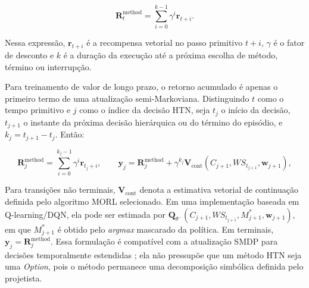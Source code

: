 \begin{equation}
\mathbf{R}^{\mathrm{method}}_t =
\sum_{i=0}^{k-1}\gamma^i\mathbf{r}_{t+i}.
\end{equation}

Nessa expressão, $\mathbf{r}_{t+i}$ é a recompensa vetorial no passo primitivo
$t+i$, $\gamma$ é o fator de desconto e $k$ é a duração da execução até a
próxima escolha de método, término ou interrupção.

Para treinamento de valor de longo prazo, o retorno acumulado é apenas o
primeiro termo de uma atualização semi-Markoviana.
Distinguindo $t$ como o tempo primitivo e $j$ como o índice da decisão HTN,
seja $t_j$ o início da decisão, $t_{j+1}$ o instante da próxima decisão
hierárquica ou do término do episódio, e $k_j=t_{j+1}-t_j$.
Então:

\begin{equation}
\mathbf{R}^{\mathrm{method}}_j =
\sum_{i=0}^{k_j-1}\gamma^i\mathbf{r}_{t_j+i},
\qquad
\mathbf{y}_j =
\mathbf{R}^{\mathrm{method}}_j +
\gamma^{k_j}\mathbf{V}_{\mathrm{cont}}(C_{j+1},WS_{t_{j+1}},\mathbf{w}_{j+1}),
\end{equation}

Para transições não terminais, $\mathbf{V}_{\mathrm{cont}}$ denota a estimativa
vetorial de continuação definida pelo algoritmo MORL selecionado. Em uma
implementação baseada em Q-learning/DQN, ela pode ser estimada por
$\mathbf{Q}_{\theta^-}(C_{j+1},WS_{t_{j+1}},M^*_{j+1},\mathbf{w}_{j+1})$, em que
$M^*_{j+1}$ é obtido pelo \textit{argmax} mascarado da política.
Em terminais, $\mathbf{y}_j=\mathbf{R}^{\mathrm{method}}_j$.
Essa formulação é compatível com a atualização SMDP para decisões
temporalmente estendidas \cite{sutton1999options}; ela não pressupõe que um método
HTN seja uma \textit{Option}, pois o método permanece uma decomposição simbólica
definida pelo projetista.

